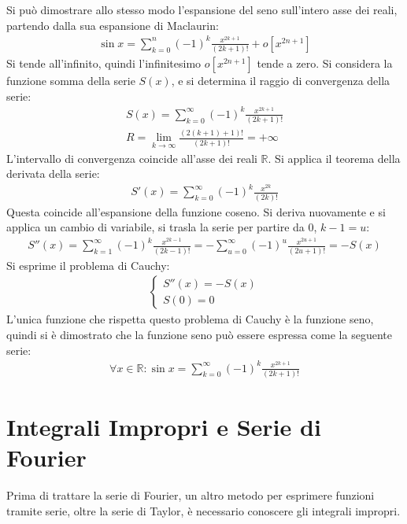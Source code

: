 \documentclass{article}
\numberwithin{equation}{subsection}
\begin{document}
Si può dimostrare allo stesso modo l'espansione del seno sull'intero asse dei reali, partendo dalla sua espansione di Maclaurin:
\begin{gather*}
    \sin x =\sum_{k=0}^n(-1)^k\frac{x^{2k+1}}{(2k+1)!}+o[x^{2n+1}]
\end{gather*}
Si tende all'infinito, quindi l'infinitesimo $o[x^{2n+1}]$ tende a zero. Si considera la funzione somma della serie $S(x)$, e si determina il raggio di convergenza della serie:
\begin{gather*}
    S(x)=\sum_{k=0}^\infty (-1)^k\frac{x^{2k+1}}{(2k+1)!}\\
    R=\lim_{k\to\infty}\frac{(2(k+1)+1)!}{(2k+1)!}=+\infty
\end{gather*}
L'intervallo di convergenza coincide all'asse dei reali $\mathbb{R}$. Si applica il teorema della derivata della serie:
\begin{gather*}
    S'(x)=\sum_{k=0}^\infty(-1)^{k}\frac{x^{2k}}{(2k)!}
\end{gather*}
Questa coincide all'espansione della funzione coseno. Si deriva nuovamente e si applica un cambio di variabile, si trasla la serie per partire da 0, $k-1=u$:
\begin{gather*}
    S''(x)=\sum_{k=1}^\infty(-1)^k\frac{x^{2k-1}}{(2k-1)!}=-\sum_{u=0}^\infty(-1)^{u}\frac{x^{2u+1}}{(2u+1)!}=-S(x)
\end{gather*}
Si esprime il problema di Cauchy:
\begin{gather*}
    \begin{cases}
        S''(x)=-S(x)\\
        S(0)=0
    \end{cases}
\end{gather*}
L'unica funzione che rispetta questo problema di Cauchy è la funzione seno, quindi si è dimostrato che la funzione seno può essere espressa come la seguente serie:
\begin{gather}
    \forall x\in\mathbb{R}:\sin x=\displaystyle\sum_{k=0}^\infty(-1)^k\frac{x^{2k+1}}{(2k+1)!}
\end{gather}

\clearpage

\section{Integrali Impropri e Serie di Fourier}
\label{sec:int-1}
Prima di trattare la serie di Fourier, un altro metodo per esprimere funzioni tramite serie, oltre la serie di Taylor, è necessario conoscere gli integrali impropri. 
\end{document}
